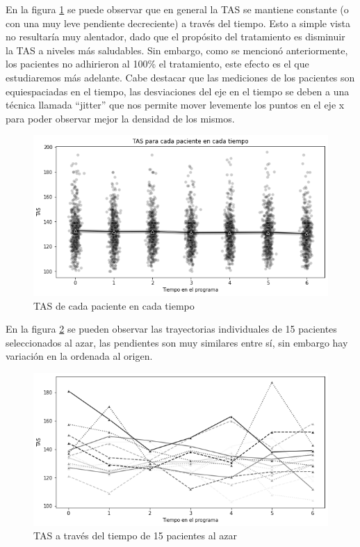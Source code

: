 \documentclass[spanish]{article}
\numberwithin{figure}{subsection}
\numberwithin{equation}{subsection}
\numberwithin{table}{subsection}
\begin{document}
En la figura \ref{TAS_vs_tpo} se puede observar que en general la TAS se
mantiene constante (o con una muy leve pendiente decreciente) a través del
tiempo. Esto a simple vista no resultaría muy alentador, dado que el propósito
del tratamiento es disminuir la TAS a niveles más saludables. Sin embargo, como
se mencionó anteriormente, los pacientes no adhirieron al 100\% el tratamiento,
este efecto es el que estudiaremos más adelante. Cabe destacar que las
mediciones de los pacientes son equiespaciadas en el tiempo, las desviaciones
del eje en el tiempo se deben a una técnica llamada ``jitter'' que nos permite
mover levemente los puntos en el eje x para poder observar mejor la densidad de
los mismos. 

\begin{figure}[H]
	\centering
	\includegraphics[scale=0.5]{img/TAS_vs_tpo.png}
	\caption{TAS de cada paciente en cada tiempo}
	\label{TAS_vs_tpo}
\end{figure}

En la figura \ref{spaghetti} se pueden observar las trayectorias individuales
de 15 pacientes seleccionados al azar, las pendientes son muy similares entre
sí, sin embargo hay variación en la ordenada al origen.

\begin{figure}[H]
	\centering
	\includegraphics[scale=0.5]{img/spaghetti_plot.png}
	\caption{TAS a través del tiempo de 15 pacientes al azar}
	\label{spaghetti}
\end{figure}
\end{document}

